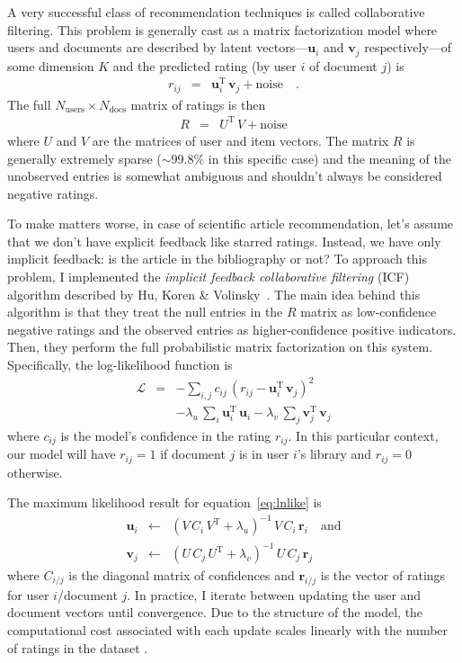 \documentclass[11pt]{article}
\newcommand{\eqlabel}[1]{\label{eq:#1}}
\begin{document}
A very successful class of recommendation techniques is called collaborative
filtering.
This problem is generally cast as a matrix factorization model where users and
documents are described by latent vectors---$\mathbf{u}_i$ and $\mathbf{v}_j$
respectively---of some dimension $K$ and the predicted rating (by user $i$ of
document $j$) is
\begin{eqnarray}
r_{ij} &=& \mathbf{u}_i^\mathrm{T} \, \mathbf{v}_j + \mathrm{noise} \quad.
\end{eqnarray}
The full $N_\mathrm{users}\times N_\mathrm{docs}$ matrix of ratings is then
\begin{eqnarray}
R &=& U^\mathrm{T}\,V + \mathrm{noise}
\end{eqnarray}
where $U$ and $V$ are the matrices of user and item vectors.
The matrix $R$ is generally extremely sparse ($\sim 99.8\%$ in this specific
case) and the meaning of the unobserved entries is somewhat ambiguous and
shouldn't always be considered negative ratings.

To make matters worse, in case of scientific article recommendation, let's
assume that we don't have explicit feedback like starred ratings.
Instead, we have only implicit feedback: is the article in the bibliography or
not?
To approach this problem, I implemented the \emph{implicit feedback
collaborative filtering} (ICF) algorithm described by Hu, Koren
\& Volinsky~.
The main idea behind this algorithm is that they treat the null entries in the
$R$ matrix as low-confidence negative ratings and the observed entries
as higher-confidence positive indicators.
Then, they perform the full probabilistic matrix factorization on this system.
Specifically, the log-likelihood function is
\begin{eqnarray}\label{eq:lnlike}
\mathcal{L} &=& -\sum_{i,j}
                c_{ij}\,(r_{ij}-\mathbf{u}_i^\mathrm{T}\,\mathbf{v}_j)^2
\nonumber\\
&& - \lambda_u\,\sum_i \mathbf{u}_i^\mathrm{T}\,\mathbf{u}_i
 - \lambda_v\,\sum_j \mathbf{v}_j^\mathrm{T}\,\mathbf{v}_j
\end{eqnarray}
where $c_{ij}$ is the model's confidence in the rating $r_{ij}$.
In this particular context, our model will have $r_{ij} = 1$ if document $j$
is in user $i$'s library and $r_{ij} = 0$ otherwise.

The maximum likelihood result for equation~\ref{eq:lnlike} is \cite{icf}
\begin{eqnarray}\eqlabel{icf-update}
\mathbf{u}_i &\gets& (V\,C_i\,V^\mathrm{T}+\lambda_u)^{-1}\,
                     V\,C_i\,\mathbf{r}_i
\quad \mathrm{and} \nonumber \\
\mathbf{v}_j &\gets& (U\,C_j\,U^\mathrm{T} + \lambda_v)^{-1}\,U\,C_j\,
                     \mathbf{r}_j
\end{eqnarray}
where $C_{i/j}$ is the diagonal matrix of confidences and $\mathbf{r}_{i/j}$
is the vector of ratings for user $i$/document $j$.
In practice, I iterate between updating the user and document vectors until
convergence.
Due to the structure of the model, the computational cost associated with each
update scales linearly with the number of ratings in the dataset \cite{icf}.
\end{document}
